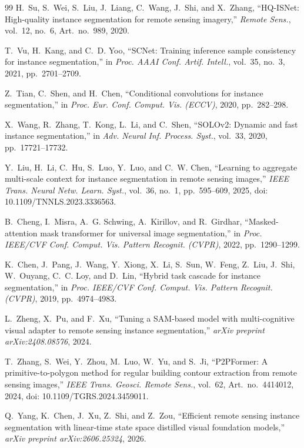 \documentclass[letterpaper,journal]{IEEEtran}
\begin{document}
\begin{thebibliography}{99}
H.~Su, S.~Wei, S.~Liu, J.~Liang, C.~Wang, J.~Shi, and X.~Zhang, ``HQ-ISNet: High-quality instance segmentation for remote sensing imagery,'' \textit{Remote Sens.}, vol.~12, no.~6, Art.~no.~989, 2020.

T.~Vu, H.~Kang, and C.~D. Yoo, ``SCNet: Training inference sample consistency for instance segmentation,'' in \textit{Proc. AAAI Conf. Artif. Intell.}, vol.~35, no.~3, 2021, pp.~2701--2709.

Z.~Tian, C.~Shen, and H.~Chen, ``Conditional convolutions for instance segmentation,'' in \textit{Proc. Eur. Conf. Comput. Vis. (ECCV)}, 2020, pp.~282--298.

X.~Wang, R.~Zhang, T.~Kong, L.~Li, and C.~Shen, ``SOLOv2: Dynamic and fast instance segmentation,'' in \textit{Adv. Neural Inf. Process. Syst.}, vol.~33, 2020, pp.~17721--17732.

Y.~Liu, H.~Li, C.~Hu, S.~Luo, Y.~Luo, and C.~W. Chen, ``Learning to aggregate multi-scale context for instance segmentation in remote sensing images,'' \textit{IEEE Trans. Neural Netw. Learn. Syst.}, vol.~36, no.~1, pp.~595--609, 2025, doi: 10.1109/TNNLS.2023.3336563.

B.~Cheng, I.~Misra, A.~G. Schwing, A.~Kirillov, and R.~Girdhar, ``Masked-attention mask transformer for universal image segmentation,'' in \textit{Proc. IEEE/CVF Conf. Comput. Vis. Pattern Recognit. (CVPR)}, 2022, pp.~1290--1299.

K.~Chen, J.~Pang, J.~Wang, Y.~Xiong, X.~Li, S.~Sun, W.~Feng, Z.~Liu, J.~Shi, W.~Ouyang, C.~C. Loy, and D.~Lin, ``Hybrid task cascade for instance segmentation,'' in \textit{Proc. IEEE/CVF Conf. Comput. Vis. Pattern Recognit. (CVPR)}, 2019, pp.~4974--4983.

L.~Zheng, X.~Pu, and F.~Xu, ``Tuning a SAM-based model with multi-cognitive visual adapter to remote sensing instance segmentation,'' \textit{arXiv preprint arXiv:2408.08576}, 2024.

T.~Zhang, S.~Wei, Y.~Zhou, M.~Luo, W.~Yu, and S.~Ji, ``P2PFormer: A primitive-to-polygon method for regular building contour extraction from remote sensing images,'' \textit{IEEE Trans. Geosci. Remote Sens.}, vol.~62, Art.~no.~4414012, 2024, doi: 10.1109/TGRS.2024.3459011.

Q.~Yang, K.~Chen, J.~Xu, Z.~Shi, and Z.~Zou, ``Efficient remote sensing instance segmentation with linear-time state space distilled visual foundation models,'' \textit{arXiv preprint arXiv:2606.25324}, 2026.


\end{thebibliography}
\end{document}
